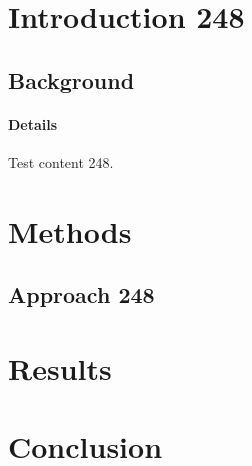 \documentclass{article}
\begin{document}
\section{Introduction 248}
\subsection{Background}
\paragraph{Details} Test content 248.
\section{Methods}
\subsection{Approach 248}
\section{Results}
\section{Conclusion}
\end{document}
